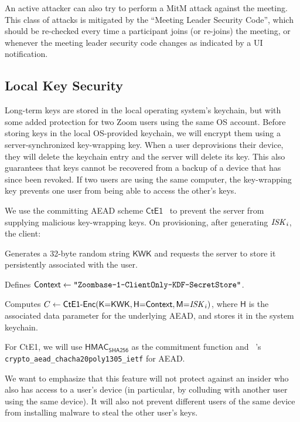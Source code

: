 An active attacker can also try to perform a MitM attack against the meeting. This class of attacks
is mitigated by the ``Meeting Leader Security Code'', which should be re-checked every time a
participant joins (or re-joins) the meeting, or whenever the meeting leader security code changes as
indicated by a UI notification. 

\subsection{Local Key Security}
\label{subsec:lks}

Long-term keys are stored in the local operating system's keychain, but with some added protection
for two Zoom users using the same OS account.
%
Before storing keys in the local OS-provided keychain, we will encrypt them using a server-synchronized key-wrapping key.
%
When a user deprovisions their device, they will delete the keychain entry and the server will
delete its key. This also guarantees that keys cannot be recovered from a backup of a device that
has since been revoked.
%
If two users are using the same computer, the key-wrapping key prevents one user from being able to access the other's keys.

We use the committing AEAD scheme $\mathsf{CtE1}$~\cite{messagefranking} to prevent the server from supplying malicious key-wrapping keys.
%
On provisioning, after generating $\mathit{ISK}_i$, the client:
\begingroup
\RaggedRight
\begin{enumerate*}
\item Generates a 32-byte random string $\mathsf{KWK}$ and requests the server to store it persistently associated with the user.
\item Defines ${\sf Context} \leftarrow \texttt{"Zoombase-1-ClientOnly-KDF-SecretStore"}$.
\item Computes $C \leftarrow \textsf{CtE1-Enc}(\textsf{K}{=}\textsf{KWK}, \textsf{H}{=}{\sf Context}, \textsf{M}{=}\mathit{ISK}_i)$, where $\textsf{H}$ is the associated data parameter for the underlying AEAD, and stores it in the system keychain.
\end{enumerate*}
\endgroup

For \textsf{CtE1}, we will use $\textsf{HMAC}_{\textsf{SHA256}}$ as the
commitment function and \sodium{}~\cite{libsodium}'s \linebreak \texttt{crypto\_aead\_chacha20poly1305\_ietf} for AEAD.

We want to emphasize that this feature will not protect against an insider who also has access to a
user's device (in particular, by colluding with another user using the same device). It will also not
prevent different users of the same device from installing malware to steal the other user's keys.

